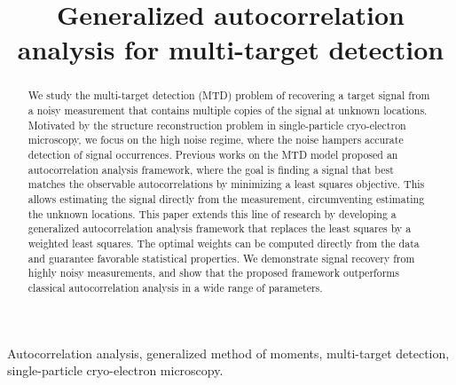 \documentclass{article}
\title{Generalized autocorrelation analysis for multi-target detection}
\begin{document}
\ninept
%
\maketitle
%
\begin{abstract}
We study the multi-target detection (MTD) problem of recovering a target signal from a noisy measurement that contains multiple copies of the signal at unknown locations. Motivated by the structure reconstruction problem in single-particle cryo-electron microscopy, we focus on the high noise regime, where the noise hampers accurate detection of signal occurrences. Previous works on the MTD model proposed an autocorrelation analysis framework, where the goal is finding a signal that best matches the observable autocorrelations by minimizing a least squares objective. This allows estimating the signal directly from the measurement, circumventing estimating the unknown locations. This paper extends this line of research by developing a generalized autocorrelation analysis framework that replaces the least squares by a weighted least squares. The optimal weights can be computed directly from the data and guarantee favorable statistical properties. We demonstrate signal recovery from highly noisy measurements, and show that the proposed framework outperforms classical autocorrelation analysis in a wide range of parameters.
\end{abstract}
%
\begin{keywords}
Autocorrelation analysis, generalized method of moments, multi-target detection, single-particle cryo-electron microscopy.
\end{keywords}
%
\end{document}
